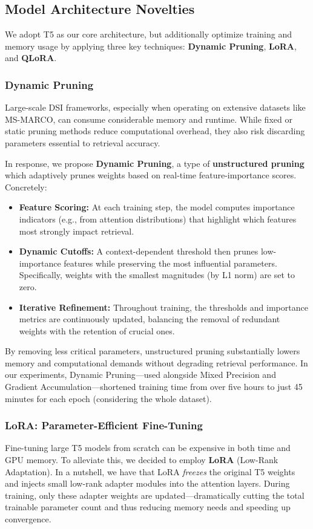 \subsection{Model Architecture Novelties}

We adopt T5 as our core architecture, but additionally optimize training and memory usage by applying three key techniques: \textbf{Dynamic Pruning}, \textbf{LoRA}, and \textbf{QLoRA}.

\subsubsection{Dynamic Pruning}
Large-scale DSI frameworks, especially when operating on extensive datasets like MS-MARCO, can consume considerable memory and runtime. While fixed or static pruning methods reduce computational overhead, they also risk discarding parameters essential to retrieval accuracy.

In response, we propose \textbf{Dynamic Pruning}, a type of \textbf{unstructured pruning} which adaptively prunes weights based on real-time feature-importance scores. Concretely:
\begin{itemize}
    \item \textbf{Feature Scoring:} At each training step, the model computes importance indicators (e.g., from attention distributions) that highlight which features most strongly impact retrieval.
    \item \textbf{Dynamic Cutoffs:} A context-dependent threshold then prunes low-importance features while preserving the most influential parameters. Specifically, weights with the smallest magnitudes (by L1 norm) are set to zero.
    \item \textbf{Iterative Refinement:} Throughout training, the thresholds and importance metrics are continuously updated, balancing the removal of redundant weights with the retention of crucial ones.
\end{itemize}
By removing less critical parameters, unstructured pruning substantially lowers memory and computational demands without degrading retrieval performance. In our experiments, Dynamic Pruning—used alongside Mixed Precision and Gradient Accumulation—shortened training time from over five hours to just 45 minutes for each epoch (considering the whole dataset). 

\subsubsection{LoRA: Parameter-Efficient Fine-Tuning}
Fine-tuning large T5 models from scratch can be expensive in both time and GPU memory. To alleviate this, we decided to employ \textbf{LoRA} (Low-Rank Adaptation). In a nutshell, we have that LoRA \emph{freezes} the original T5 weights and injects small low-rank adapter modules into the attention layers. During training, only these adapter weights are updated—dramatically cutting the total trainable parameter count and thus reducing memory needs and speeding up convergence.

